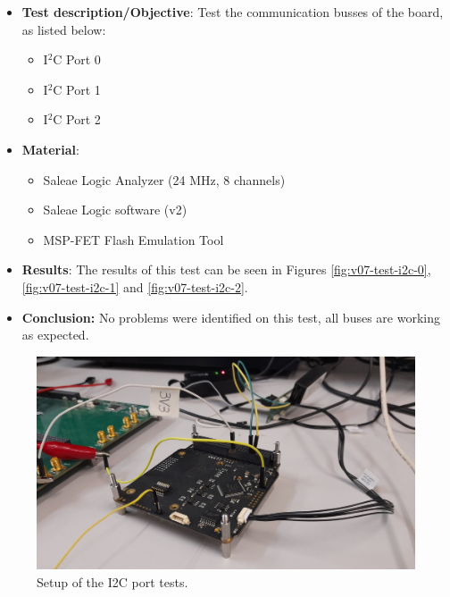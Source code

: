 \begin{itemize}
    \item \textbf{Test description/Objective}: Test the communication busses of the board, as listed below:
        \begin{itemize}
            \item I$^{2}$C Port 0
            \item I$^{2}$C Port 1
            \item I$^{2}$C Port 2
        \end{itemize}
    \item \textbf{Material}:
        \begin{itemize}
            \item Saleae Logic Analyzer (24 MHz, 8 channels)
            \item Saleae Logic software (v2)
            \item MSP-FET Flash Emulation Tool
        \end{itemize}
    \item \textbf{Results}: The results of this test can be seen in Figures \ref{fig:v07-test-i2c-0}, \ref{fig:v07-test-i2c-1} and \ref{fig:v07-test-i2c-2}.
    \item \textbf{Conclusion:} No problems were identified on this test, all buses are working as expected.
\end{itemize}

\begin{figure}[!ht]
    \begin{center}
        \includegraphics[width=\columnwidth]{figures/v07/obdh2-i2c-test.jpg}
        \caption{Setup of the I2C port tests.}
        \label{fig:v07-test-i2c}
    \end{center}
\end{figure}

